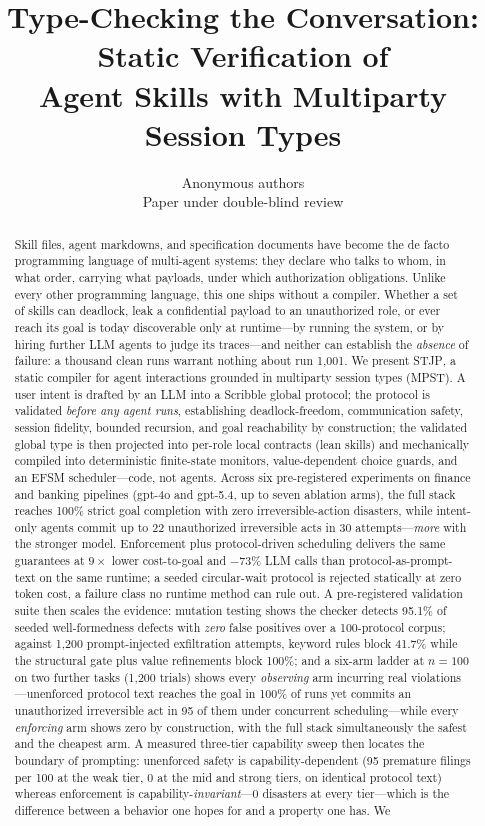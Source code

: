 \documentclass{article}
\title{\bf Type-Checking the Conversation: Static Verification of\\ Agent Skills with Multiparty Session Types}
\author{Anonymous authors\\ \small Paper under double-blind review}
\date{}
\newcommand{\stjp}{\textsc{STJP}}
\begin{document}
\maketitle

\begin{abstract}
Skill files, agent markdowns, and specification documents have become the de facto programming language of multi-agent systems: they declare who talks to whom, in what order, carrying what payloads, under which authorization obligations. Unlike every other programming language, this one ships without a compiler. Whether a set of skills can deadlock, leak a confidential payload to an unauthorized role, or ever reach its goal is today discoverable only at runtime---by running the system, or by hiring further LLM agents to judge its traces---and neither can establish the \emph{absence} of failure: a thousand clean runs warrant nothing about run 1{,}001. We present \stjp{}, a static compiler for agent interactions grounded in multiparty session types (MPST). A user intent is drafted by an LLM into a Scribble global protocol; the protocol is validated \emph{before any agent runs}, establishing deadlock-freedom, communication safety, session fidelity, bounded recursion, and goal reachability by construction; the validated global type is then projected into per-role local contracts (lean skills) and mechanically compiled into deterministic finite-state monitors, value-dependent choice guards, and an EFSM scheduler---code, not agents. Across six pre-registered experiments on finance and banking pipelines (gpt-4o and gpt-5.4, up to seven ablation arms), the full stack reaches 100\% strict goal completion with zero irreversible-action disasters, while intent-only agents commit up to 22 unauthorized irreversible acts in 30 attempts---\emph{more} with the stronger model. Enforcement plus protocol-driven scheduling delivers the same guarantees at $9\times$ lower cost-to-goal and $-73\%$ LLM calls than protocol-as-prompt-text on the same runtime; a seeded circular-wait protocol is rejected statically at zero token cost, a failure class no runtime method can rule out. A pre-registered validation suite then scales the evidence: mutation testing shows the checker detects 95.1\% of seeded well-formedness defects with \emph{zero} false positives over a 100-protocol corpus; against 1{,}200 prompt-injected exfiltration attempts, keyword rules block 41.7\% while the structural gate plus value refinements block 100\%; and a six-arm ladder at $n{=}100$ on two further tasks (1{,}200 trials) shows every \emph{observing} arm incurring real violations---unenforced protocol text reaches the goal in 100\% of runs yet commits an unauthorized irreversible act in 95 of them under concurrent scheduling---while every \emph{enforcing} arm shows zero by construction, with the full stack simultaneously the safest and the cheapest arm. A measured three-tier capability sweep then locates the boundary of prompting: unenforced safety is capability-dependent (95 premature filings per 100 at the weak tier, 0 at the mid and strong tiers, on identical protocol text) whereas enforcement is capability-\emph{invariant}---0 disasters at every tier---which is the difference between a behavior one hopes for and a property one has. We 
\end{abstract}
\end{document}
